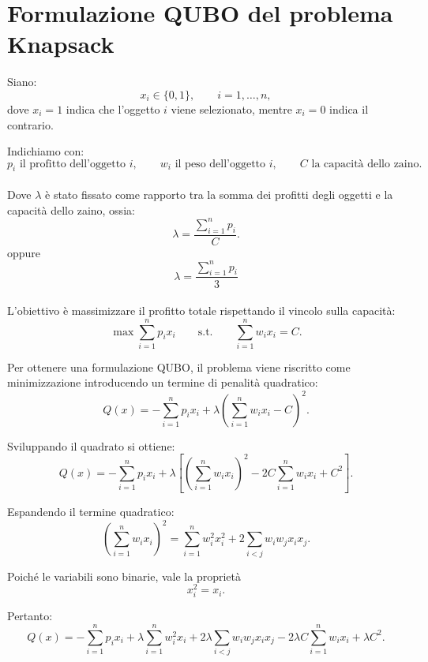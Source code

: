 \documentclass[a4paper,12pt]{article}
\begin{document}
\section*{Formulazione QUBO del problema Knapsack}

Siano:
\[
x_i \in \{0,1\}, \qquad i=1,\dots,n,
\]
dove \(x_i = 1\) indica che l'oggetto \(i\) viene selezionato, mentre \(x_i = 0\) indica il contrario.

Indichiamo con:
\[
p_i \text{ il profitto dell'oggetto } i, \qquad
w_i \text{ il peso dell'oggetto } i, \qquad
C \text{ la capacità dello zaino.}
\]

\paragraph{}
Dove \(\lambda\) è stato fissato come rapporto tra la somma dei profitti degli oggetti e la capacità dello zaino, ossia:
\[
\lambda = \frac{\sum_{i=1}^{n} p_i}{C}.
\]
oppure
\[
\lambda = \frac{\sum_{i=1}^{n} p_i}{3}
\]

\paragraph{}
L'obiettivo è massimizzare il profitto totale rispettando il vincolo sulla capacità:
\[
\max \sum_{i=1}^{n} p_i x_i
\qquad \text{s.t.} \qquad
\sum_{i=1}^{n} w_i x_i = C.
\]

Per ottenere una formulazione QUBO, il problema viene riscritto come minimizzazione introducendo un termine di penalità quadratico:
\begin{equation}
Q(x) = -\sum_{i=1}^{n} p_i x_i + \lambda \left( \sum_{i=1}^{n} w_i x_i - C \right)^2 .
\end{equation}

Sviluppando il quadrato si ottiene:
\begin{equation}
Q(x) =
-\sum_{i=1}^{n} p_i x_i
+ \lambda \left[
\left(\sum_{i=1}^{n} w_i x_i\right)^2
- 2C \sum_{i=1}^{n} w_i x_i
+ C^2
\right].
\end{equation}

Espandendo il termine quadratico:
\begin{equation}
\left(\sum_{i=1}^{n} w_i x_i\right)^2
=
\sum_{i=1}^{n} w_i^2 x_i^2
+
2\sum_{i<j} w_i w_j x_i x_j.
\end{equation}

Poiché le variabili sono binarie, vale la proprietà
\[
x_i^2 = x_i.
\]

Pertanto:
\begin{equation}
Q(x) =
-\sum_{i=1}^{n} p_i x_i
+ \lambda \sum_{i=1}^{n} w_i^2 x_i
+ 2\lambda \sum_{i<j} w_i w_j x_i x_j
- 2\lambda C \sum_{i=1}^{n} w_i x_i
+ \lambda C^2.
\end{equation}
\end{document}
